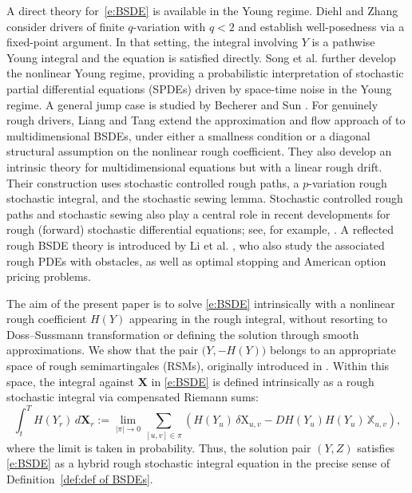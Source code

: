 \documentclass[11pt,reqno]{amsart}
\numberwithin{equation}{section}
\begin{document}
A direct theory for~\eqref{e:BSDE} is available in the Young regime. Diehl and Zhang
\cite{diehl2017young} consider drivers of finite $q$-variation with
$q<2$ and establish well-posedness via a fixed-point argument. In that setting,
the integral involving $Y$ is a pathwise Young integral and the equation is
satisfied directly. Song et al. \cite{BSDEYoung-I, BSDEYoung-II} further develop the nonlinear Young regime, providing a probabilistic interpretation of stochastic partial differential equations (SPDEs) driven by space-time noise in the Young regime. A general jump case is studied by Becherer and Sun \cite{BS25}. For genuinely rough drivers, Liang and Tang
\cite{liang2025multidimensional} extend the approximation and flow approach
of \cite{DF} to multidimensional BSDEs, under either a smallness condition or
a diagonal structural assumption on the nonlinear rough coefficient. They
also develop an intrinsic theory for multidimensional equations but with a
linear rough drift. Their construction
uses stochastic controlled rough paths, a $p$-variation rough stochastic
integral, and the stochastic sewing lemma. Stochastic controlled rough paths
and stochastic sewing also play a central role in recent developments for
rough (forward) stochastic differential equations; see, for example,
\cite{fhl21,allan2024rough}. A reflected rough BSDE theory is introduced by Li et al. \cite{li2024reflected}, who also study the associated  rough PDEs with obstacles, as well as optimal stopping and American option pricing problems. 

The aim of the present paper is to solve \eqref{e:BSDE} intrinsically
with a
nonlinear rough coefficient $H(Y)$ appearing in the rough integral,
without resorting to  Doss--Sussmann transformation or defining the solution through smooth approximations. We
show that the pair $\bigl(Y,-H(Y)\bigr)$
belongs to an appropriate space of rough semimartingales (RSMs), originally introduced in \cite{friz2023rough}. Within this
space, the integral against $\mathbf X$ in \eqref{e:BSDE} is defined intrinsically as a rough stochastic
integral via compensated Riemann sums:
\begin{equation}\label{e:intro rough integral}
\int_t^T H(Y_r)\,d\mathbf X_r
:=
\lim_{|\pi|\to0}
\sum_{[u,v]\in\pi}
\left(
H(Y_u)\,\delta\mathrm X_{u,v}
-
DH(Y_u)H(Y_u)\,\mathbb X_{u,v}
\right),
\end{equation}
where the limit is taken in probability. Thus, the solution pair $(Y,Z)$
satisfies \eqref{e:BSDE} as a hybrid rough stochastic integral equation in
the precise sense of Definition~\ref{def:def of BSDEs}.
\end{document}
